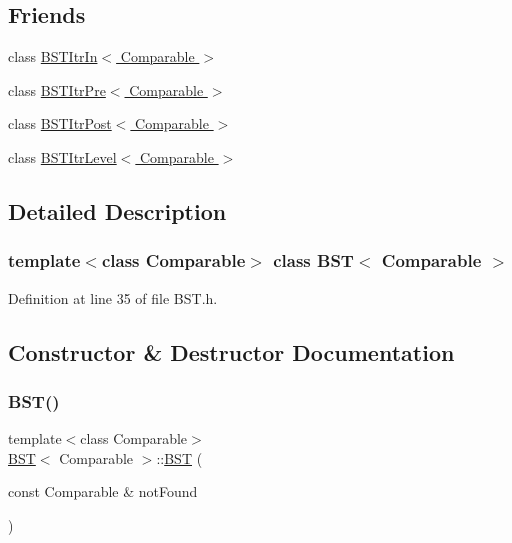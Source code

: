\subsection*{Friends}
\begin{DoxyCompactItemize}
\item 
class \hyperlink{class_b_s_t_aab3993acac2ab24a0b59edb0c3acc775}{B\+S\+T\+Itr\+In$<$ Comparable $>$}
\item 
class \hyperlink{class_b_s_t_a45a55df6f11541416d4ea7684c575c1a}{B\+S\+T\+Itr\+Pre$<$ Comparable $>$}
\item 
class \hyperlink{class_b_s_t_a5dc153694be266f6e772659486219da7}{B\+S\+T\+Itr\+Post$<$ Comparable $>$}
\item 
class \hyperlink{class_b_s_t_a26ff00bc0d87069aed877f10fd3c80a8}{B\+S\+T\+Itr\+Level$<$ Comparable $>$}
\end{DoxyCompactItemize}


\subsection{Detailed Description}
\subsubsection*{template$<$class Comparable$>$\newline
class B\+S\+T$<$ Comparable $>$}



Definition at line 35 of file B\+S\+T.\+h.



\subsection{Constructor \& Destructor Documentation}
\hypertarget{class_b_s_t_a3185a79cf472271f122a97d0f59022d1}{}\label{class_b_s_t_a3185a79cf472271f122a97d0f59022d1} 
\subsubsection{\texorpdfstring{B\+S\+T()}{BST()}\hspace{0.1cm}{\footnotesize\ttfamily [1/2]}}
{\footnotesize\ttfamily template$<$class Comparable$>$ \\
\hyperlink{class_b_s_t}{B\+ST}$<$ Comparable $>$\+::\hyperlink{class_b_s_t}{B\+ST} (\begin{DoxyParamCaption}\item[{const Comparable \&}]{not\+Found }\end{DoxyParamCaption})\hspace{0.3cm}{\ttfamily [explicit]}}




